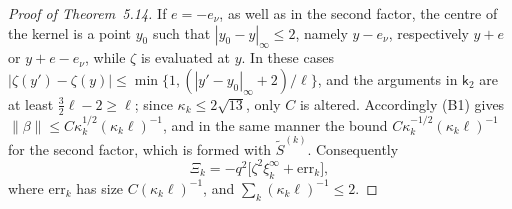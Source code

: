 \documentclass[11pt]{amsart}
\theoremstyle{definition}
\begin{document}
\begin{proof}[Proof of Theorem~5.14]
If $e=-e_\nu$, as well as in the second factor, the centre of the kernel is a point $y_0$ such that $|y_0-y|_\infty\le2$, namely $y-e_\nu$, respectively $y+e$ or $y+e-e_\nu$, while $\zeta$ is evaluated at $y$.
In these cases $|\zeta(y')-\zeta(y)|\le\min\{1,(|y'-y_0|_\infty+2)/\ell\}$, and the arguments in $\mathsf k_2$ are at least $\frac32\ell-2\ge\ell$; since $\kappa_k\le2\sqrt{13}$, only $C$ is altered.
Accordingly (B1) gives $\|\beta\|\le C\kappa_k^{1/2}(\kappa_k\ell)^{-1}$, and in the same manner the bound $C\kappa_k^{-1/2}(\kappa_k\ell)^{-1}$ for the second factor, which is formed with $\tilde S^{(k)}$.
Consequently
\begin{equation*}
\Xi_k=-q^2\bigl[\zeta^2\xi_k^\infty+\mathrm{err}_k\bigr],
\end{equation*}
where $\mathrm{err}_k$ has size $C(\kappa_k\ell)^{-1}$, and $\sum_k(\kappa_k\ell)^{-1}\le2$.


\end{proof}
\end{document}
